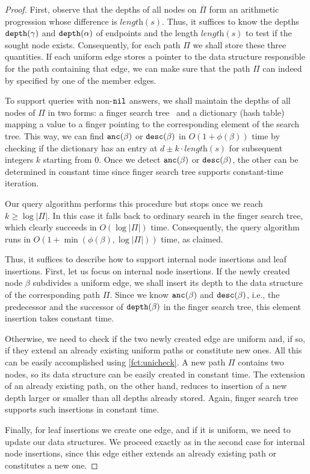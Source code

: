 \documentclass[a4paper]{article}
\theoremstyle{remark}
\newcommand{\slength}{\textit{length}}
\begin{document}
\begin{proof}
First, observe that the depths of all nodes on $\overline{\Pi}$ form an arithmetic progression whose difference is $\slength(s)$.
Thus, it suffices to know the depths $\mathtt{depth}(\gamma)$ and $\mathtt{depth}(\alpha)$ of endpoints and the length $\slength(s)$
to test if the sought node exists.
Consequently, for each path $\Pi$ we shall store these three quantities. If each uniform edge stores a pointer to the data structure responsible for the path containing that edge, we can make sure  that the path $\Pi$ can indeed by specified by one of the member edges.

To support queries with non-$\mathtt{nil}$ answers, we shall maintain the depths of all nodes of $\Pi$ in two forms:
a finger search tree~\cite{BrodalLMTT03} and a dictionary (hash table) mapping a value to a finger pointing to the corresponding element of the search tree.
This way, we can find $\mathtt{anc}(\beta)$ or $\mathtt{desc}(\beta)$
in $O(1+\phi(\beta))$ time by checking if the dictionary has an entry at $d\pm k \cdot \slength(s)$ for subsequent integers $k$ starting from $0$.
Once we detect $\mathtt{anc}(\beta)$ or $\mathtt{desc}(\beta)$, the other can be determined in constant time since finger search tree supports
constant-time iteration.

Our query algorithm performs this procedure but stops once we reach $k\ge \log |\Pi|$. In this case it falls back to ordinary search
in the finger search tree, which clearly succeeds in $O(\log |\Pi|)$ time.
Consequently, the query algorithm runs in $O(1+\min(\phi(\beta),\log |\Pi|))$ time, as claimed.

Thus, it suffices to describe how to support internal node insertions and leaf insertions.
First, let us focus on internal node insertions. If the newly created node $\beta$ subdivides a uniform edge,
we shall insert its depth to the data structure of the corresponding path $\Pi$.
Since we know $\mathtt{anc}(\beta)$ and $\mathtt{desc}(\beta)$, i.e., the predecessor and the successor of $\mathtt{depth}(\beta)$ in the finger search tree,
this element insertion takes constant time.

Otherwise, we need to check if the two newly created edge are uniform and, if so, if they extend an already existing uniform paths
or constitute new ones. All this can be easily accomplished using \cref{fct:unicheck}.
A new path $\Pi$ contains two nodes, so its data structure can be easily created in constant time.
The extension of an already existing path, on the other hand, reduces to insertion of a new depth larger or smaller than
all depths already stored. Again, finger search tree supports such insertions in constant time.

Finally, for leaf insertions we create one edge, and if it is uniform, we need to update our data structures.
We proceed exactly as in the second case for internal node insertions, since this edge either extends
an already existing path or constitutes a new one.
\end{proof}
\end{document}
